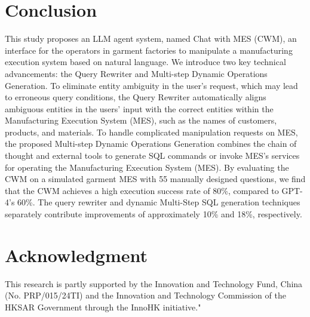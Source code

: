 \documentclass[preprint,12pt]{elsarticle}
\begin{document}



\section{Conclusion}
\label{sec:conclusion}
This study proposes an LLM agent system, named Chat with MES (CWM), an interface for the operators in garment factories to manipulate a manufacturing execution system based on natural language.
We introduce two key technical advancements: the Query Rewriter and Multi-step Dynamic Operations Generation.
To eliminate entity ambiguity in the user's request, which may lead to erroneous query conditions, the Query Rewriter automatically aligns ambiguous entities in the users' input with the correct entities within the Manufacturing Execution System (MES), such as the names of customers, products, and materials.
To handle complicated manipulation requests on MES, the proposed Multi-step Dynamic Operations Generation combines the chain of thought and external tools to generate SQL commands or invoke MES's services for operating the Manufacturing Execution System (MES).
By evaluating the CWM on a simulated garment MES with 55 manually designed questions, we find that the CWM achieves a high execution success rate of 80\%, compared to GPT-4's 60\%. 
The query rewriter and dynamic Multi-Step SQL generation techniques separately contribute improvements of approximately 10\% and 18\%, respectively.

\section{Acknowledgment}
This research is partly supported by the Innovation and Technology Fund, China (No. PRP/015/24TI) and the Innovation and Technology Commission of the HKSAR Government through the InnoHK initiative."



\end{document}
